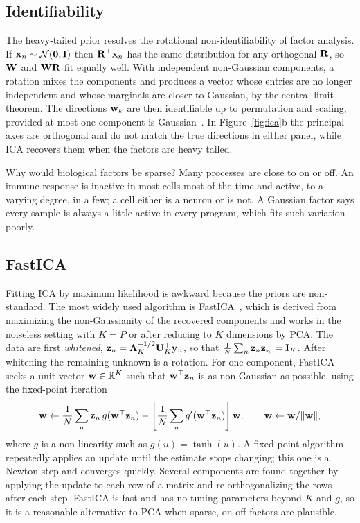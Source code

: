 \subsection{Identifiability}

The heavy-tailed prior resolves the rotational non-identifiability of factor analysis. If $\mathbf{x}_n\sim\mathcal{N}(\mathbf{0},\mathbf{I})$ then $\mathbf{R}^\top\mathbf{x}_n$ has the same distribution for any orthogonal $\mathbf{R}$, so $\mathbf{W}$ and $\mathbf{W}\mathbf{R}$ fit equally well. With independent non-Gaussian components, a rotation mixes the components and produces a vector whose entries are no longer independent and whose marginals are closer to Gaussian, by the central limit theorem. The directions $\mathbf{w}_k$ are then identifiable up to permutation and scaling, provided at most one component is Gaussian~\citep{comon1994}. In Figure~\ref{fig:ica}b the principal axes are orthogonal and do not match the true directions in either panel, while ICA recovers them when the factors are heavy tailed.

Why would biological factors be sparse? Many processes are close to on or off. An immune response is inactive in most cells most of the time and active, to a varying degree, in a few; a cell either is a neuron or is not. A Gaussian factor says every sample is always a little active in every program, which fits such variation poorly.

\subsection{FastICA}

Fitting ICA by maximum likelihood is awkward because the priors are non-standard. The most widely used algorithm is FastICA~\citep{hyvarinen1999,hyvarinen2000}, which is derived from maximizing the non-Gaussianity of the recovered components and works in the noiseless setting with $K=P$ or after reducing to $K$ dimensions by PCA. The data are first \emph{whitened}, $\mathbf{z}_n=\boldsymbol{\Lambda}_K^{-1/2}\mathbf{U}_K^\top\mathbf{y}_n$, so that $\frac1N\sum_n\mathbf{z}_n\mathbf{z}_n^\top=\mathbf{I}_K$. After whitening the remaining unknown is a rotation. For one component, FastICA seeks a unit vector $\mathbf{w}\in\mathbb{R}^K$ such that $\mathbf{w}^\top\mathbf{z}_n$ is as non-Gaussian as possible, using the fixed-point iteration
\begin{equation}
  \mathbf{w}\leftarrow\frac1N\sum_n\mathbf{z}_n\,g(\mathbf{w}^\top\mathbf{z}_n)-\left[\frac1N\sum_ng'(\mathbf{w}^\top\mathbf{z}_n)\right]\mathbf{w}, \qquad \mathbf{w}\leftarrow\mathbf{w}/\|\mathbf{w}\|,
\end{equation}
where $g$ is a non-linearity such as $g(u)=\tanh(u)$. A fixed-point algorithm repeatedly applies an update until the estimate stops changing; this one is a Newton step and converges quickly. Several components are found together by applying the update to each row of a matrix and re-orthogonalizing the rows after each step. FastICA is fast and has no tuning parameters beyond $K$ and $g$, so it is a reasonable alternative to PCA when sparse, on-off factors are plausible.

